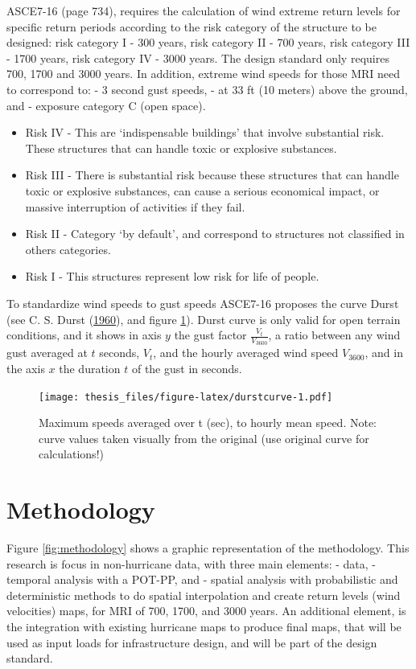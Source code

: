 \documentclass[12pt,oneside]{reedthesis}
\providecommand{\tightlist}{%
  \setlength{\itemsep}{0pt}\setlength{\parskip}{0pt}}
\begin{document}
ASCE7-16 (page 734), requires the calculation of wind extreme return levels for specific return periods according to the risk category of the structure to be designed: risk category I - 300 years, risk category II - 700 years, risk category III - 1700 years, risk category IV - 3000 years. The design standard only requires 700, 1700 and 3000 years. In addition, extreme wind speeds for those MRI need to correspond to: - 3 second gust speeds, - at 33 ft (10 meters) above the ground, and - exposure category C (open space).
\begin{itemize}
\tightlist
\item
  Risk IV - This are `indispensable buildings' that involve substantial risk. These structures that can handle toxic or explosive substances.
\item
  Risk III - There is substantial risk because these structures that can handle toxic or explosive substances, can cause a serious economical impact, or massive interruption of activities if they fail.
\item
  Risk II - Category `by default', and correspond to structures not classified in others categories.
\item
  Risk I - This structures represent low risk for life of people.
\end{itemize}
To standardize wind speeds to gust speeds ASCE7-16 proposes the curve Durst (see C. S. Durst (\protect\hyperlink{ref-Durst1960}{1960}), and figure \ref{fig:durstcurve}). Durst curve is only valid for open terrain conditions, and it shows in axis \(y\) the gust factor \(\frac{V_t}{V_{3600}}\), a ratio between any wind gust averaged at \(t\) seconds, \(V_t\), and the hourly averaged wind speed \(V_{3600}\), and in the axis \(x\) the duration \(t\) of the gust in seconds.
\begin{figure}
\centering
\texttt{[image: thesis\_files/figure-latex/durstcurve-1.pdf]}
\caption{\label{fig:durstcurve}Maximum speeds averaged over t (sec), to hourly mean speed. Note: curve values taken visually from the original (use original curve for calculations!)}
\end{figure}
\hypertarget{rmd-method}{%
\chapter{Methodology}\label{rmd-method}}

Figure \ref{fig:methodology} shows a graphic representation of the methodology. This research is focus in non-hurricane data, with three main elements: - data, - temporal analysis with a POT-PP, and - spatial analysis with probabilistic and deterministic methods to do spatial interpolation and create return levels (wind velocities) maps, for MRI of 700, 1700, and 3000 years. An additional element, is the integration with existing hurricane maps to produce final maps, that will be used as input loads for infrastructure design, and will be part of the design standard.
\end{document}
